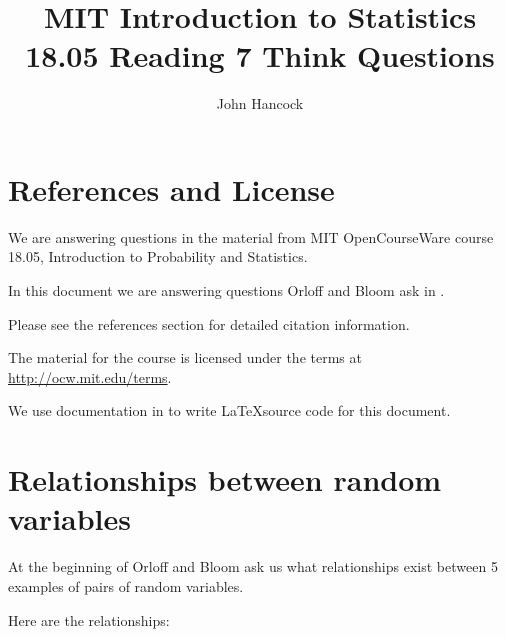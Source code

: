 \documentclass[a4paper,11pt]{article}
\author{John Hancock}
\title{MIT Introduction to Statistics 18.05 Reading 7 Think Questions}
\begin{document}
\maketitle
\tableofcontents
\section{References and License}
We are answering questions in the material from MIT OpenCourseWare
course 18.05, Introduction to Probability and Statistics.

In this document we are answering questions Orloff and Bloom ask in
\cite{reading7}.

Please see the references section for detailed citation information.

The material for the course is licensed under the terms at
\url{http://ocw.mit.edu/terms}.

We use documentation in \cite{threeDFill} to write \LaTeX source code for this
document.

\section{Relationships between random variables}

At the beginning of \cite{reading7} Orloff and Bloom ask us what relationships
exist between 5 examples of pairs of random variables.

Here are the relationships:
\end{document}
